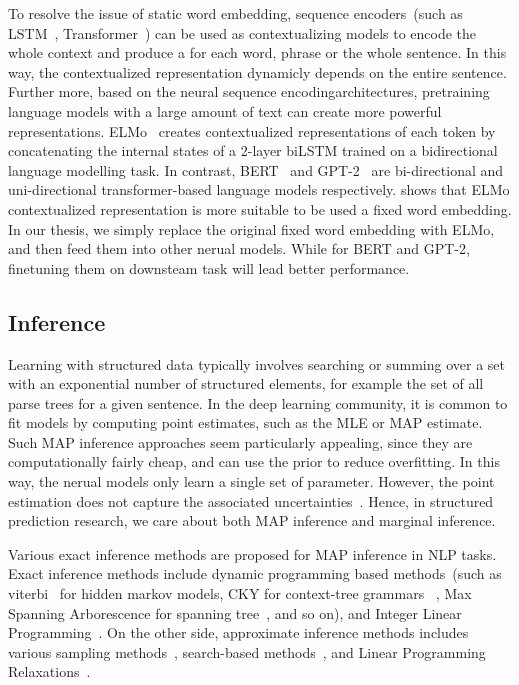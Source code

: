 To resolve the issue of static word embedding, sequence encoders~(such
as LSTM~\citep{hochreiter97lstm}, Transformer~\citep{NIPS2017_7181})
can be used as contextualizing models to encode the whole context and
produce a  for each word, phrase or
the whole sentence. In this way, the contextualized representation
dynamicly depends on the entire sentence.  Further more, based on the
neural sequence encodingarchitectures, pretraining language models
with a large amount of text can create more powerful representations.
ELMo~\cite{elmo} creates contextualized representations of each token
by concatenating the internal states of a 2-layer biLSTM trained on a
bidirectional language modelling task. In contrast,
BERT~\citep{devlin2019bert} and GPT-2~\citep{radford2018improving} are
bi-directional and uni-directional transformer-based language models
respectively. \citet{peters2019tune} shows that ELMo contextualized
representation is more suitable to be used a fixed word embedding. In
our thesis, we simply replace the original fixed word embedding with
ELMo, and then feed them into other nerual models. While for BERT and
GPT-2, finetuning them on downsteam task will lead better performance.

\subsection{Inference}
\label{ssec:bg:inference}
Learning with structured data typically involves searching or summing
over a set with an exponential number of structured elements, for
example the set of all parse trees for a given sentence. In the deep
learning community, it is common to fit models by computing point
estimates, such as the MLE or MAP estimate. Such MAP inference
approaches seem particularly appealing, since they are computationally
fairly cheap, and can use the prior to reduce overfitting. In this
way, the nerual models only learn a single set of parameter. However,
the point estimation does not capture the associated
uncertainties~\citep{murphy2022probabilistic,wilson2020bayesian}.
Hence, in structured prediction research, we care about both MAP
inference and marginal inference.

 Various exact inference methods are proposed
for MAP inference in NLP tasks.  Exact inference methods include
dynamic programming based methods~(such as
viterbi~\citep{viterbi1967error} for hidden markov models, CKY for
context-tree
grammars~\cite{kasami1966efficient,younger1967recognition,cocke1969programming}
, Max Spanning Arborescence for spanning
tree~\cite{chu1965shortest,edmonds1967optimum}, and so on), and
Integer Linear
Programming~\citep{roth2005integer,roth2007global,berant2014modeling}. On
the other side, approximate inference methods includes various
sampling methods~\citep{finkel2005incorporating,singh2012monte},
search-based
methods~\citep{daume2009search,ross2011reduction,chang2015learning},
and Linear Programming
Relaxations~\citep{rush2012tutorial,werner2014power}.

